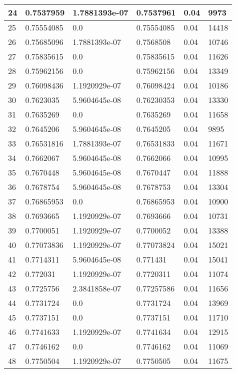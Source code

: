 \begin{longtable}{|l|l|l|l|l|l|}
24 & 0.7537959 & 1.7881393e-07 & 0.7537961 & 0.04 & 9973 \\ \hline 
25 & 0.75554085 & 0.0 & 0.75554085 & 0.04 & 14418 \\ \hline 
26 & 0.75685096 & 1.7881393e-07 & 0.7568508 & 0.04 & 10746 \\ \hline 
27 & 0.75835615 & 0.0 & 0.75835615 & 0.04 & 11626 \\ \hline 
28 & 0.75962156 & 0.0 & 0.75962156 & 0.04 & 13349 \\ \hline 
29 & 0.76098436 & 1.1920929e-07 & 0.76098424 & 0.04 & 10186 \\ \hline 
30 & 0.7623035 & 5.9604645e-08 & 0.76230353 & 0.04 & 13330 \\ \hline 
31 & 0.7635269 & 0.0 & 0.7635269 & 0.04 & 11658 \\ \hline 
32 & 0.7645206 & 5.9604645e-08 & 0.7645205 & 0.04 & 9895 \\ \hline 
33 & 0.76531816 & 1.7881393e-07 & 0.76531833 & 0.04 & 11671 \\ \hline 
34 & 0.7662067 & 5.9604645e-08 & 0.7662066 & 0.04 & 10995 \\ \hline 
35 & 0.7670448 & 5.9604645e-08 & 0.7670447 & 0.04 & 11888 \\ \hline 
36 & 0.7678754 & 5.9604645e-08 & 0.7678753 & 0.04 & 13304 \\ \hline 
37 & 0.76865953 & 0.0 & 0.76865953 & 0.04 & 10900 \\ \hline 
38 & 0.7693665 & 1.1920929e-07 & 0.7693666 & 0.04 & 10731 \\ \hline 
39 & 0.7700051 & 1.1920929e-07 & 0.7700052 & 0.04 & 13388 \\ \hline 
40 & 0.77073836 & 1.1920929e-07 & 0.77073824 & 0.04 & 15021 \\ \hline 
41 & 0.7714311 & 5.9604645e-08 & 0.771431 & 0.04 & 15041 \\ \hline 
42 & 0.772031 & 1.1920929e-07 & 0.7720311 & 0.04 & 11074 \\ \hline 
43 & 0.7725756 & 2.3841858e-07 & 0.77257586 & 0.04 & 11656 \\ \hline 
44 & 0.7731724 & 0.0 & 0.7731724 & 0.04 & 13969 \\ \hline 
45 & 0.7737151 & 0.0 & 0.7737151 & 0.04 & 11710 \\ \hline 
46 & 0.7741633 & 1.1920929e-07 & 0.7741634 & 0.04 & 12915 \\ \hline 
47 & 0.7746162 & 0.0 & 0.7746162 & 0.04 & 11069 \\ \hline 
48 & 0.7750504 & 1.1920929e-07 & 0.7750505 & 0.04 & 11675 \\ \hline 

\end{longtable}
